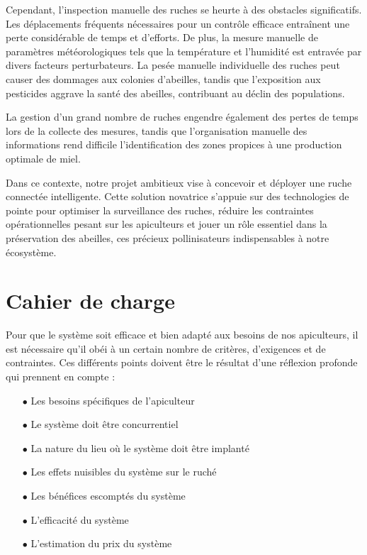 \documentclass[a4paper,12pt]{report}
\begin{document}
Cependant, l'inspection manuelle des ruches se heurte à des obstacles significatifs. Les déplacements fréquents nécessaires pour un contrôle efficace entraînent une perte considérable de temps et d'efforts. De plus, la mesure manuelle de paramètres météorologiques tels que la température et l'humidité est entravée par divers facteurs perturbateurs. La pesée manuelle individuelle des ruches peut causer des dommages aux colonies d'abeilles, tandis que l'exposition aux pesticides aggrave la santé des abeilles, contribuant au déclin des populations.

La gestion d'un grand nombre de ruches engendre également des pertes de temps lors de la collecte des mesures, tandis que l'organisation manuelle des informations rend difficile l'identification des zones propices à une production optimale de miel.

Dans ce contexte, notre projet ambitieux vise à concevoir et déployer une ruche connectée intelligente. Cette solution novatrice s'appuie sur des technologies de pointe pour optimiser la surveillance des ruches, réduire les contraintes opérationnelles pesant sur les apiculteurs et jouer un rôle essentiel dans la préservation des abeilles, ces précieux pollinisateurs indispensables à notre écosystème.
	
	\section*{Cahier de charge}
	Pour que le système soit efficace et bien adapté aux besoins de nos apiculteurs, il
	est nécessaire qu’il obéi à un certain nombre de critères, d’exigences et de contraintes. Ces différents points doivent être le résultat d’une réflexion profonde qui prennent en compte :
	
	
	\begin{itemize}
		\item [$\bullet$] Les besoins spécifiques de l’apiculteur
		\item [$\bullet$]Le système doit être concurrentiel
		\item [$\bullet$] La nature du lieu où le système doit être implanté 
		\item [$\bullet$]Les effets nuisibles du système sur le ruché 
		\item [$\bullet$]Les bénéfices escomptés du système 
		\item [$\bullet$] L’efficacité du système 
		\item [$\bullet$] L’estimation du prix du système 
		
	\end{itemize}
	
\end{document}
